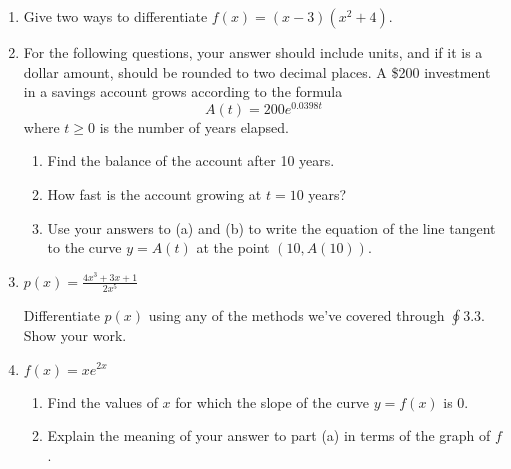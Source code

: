 \documentclass[12pt,letterpaper]{article}
\begin{document}
\begin{enumerate}
\vspace{1pc}	
\item Give two ways to differentiate $f(x)=(x-3)(x^2+4)$.

\vspace{1pc}
\item For the following questions, your answer should include units, and if it is a dollar amount, should be rounded to two decimal places.  A \$200 investment in a savings account grows according to the formula
\[A(t)=200e^{0.0398t}\]
where $t\geq 0$ is the number of years elapsed.
	\begin{enumerate}
	\item Find the balance of the account after 10 years.
	\item How fast is the account growing at $t=10$ years?
	\item Use your answers to (a) and (b) to write the equation of the line tangent to the curve $y=A(t)$ at the point $(10,A(10))$.
	\end{enumerate}

\vspace{1pc}	
\item $\displaystyle p(x)=\frac{4x^3+3x+1}{2x^5}$

Differentiate $p(x)$ using any of the methods we've covered through $\oint 3.3$.  Show your work.

\vspace{1pc}
\item $f(x)=xe^{2x}$
	\begin{enumerate}
	\item Find the values of $x$ for which the slope of the curve $y=f(x)$ is 0.
	\item Explain the meaning of your answer to part (a) in terms of the graph of $f$.
	\end{enumerate}
\end{enumerate}
\end{document}
